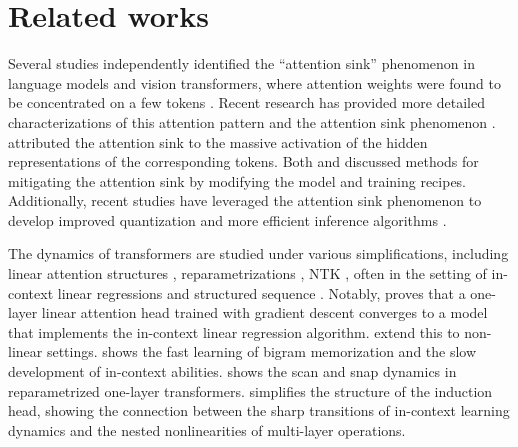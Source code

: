 \section{Related works}
Several studies independently identified the ``attention sink'' phenomenon in language models and vision transformers,  where attention weights were found to be concentrated on a few tokens \citep{xiao2023efficient, darcet2023vision, han2023lm, zhai2023stabilizing, elhage2023privileged, dettmers2022gpt3}. Recent research has provided more detailed characterizations of this attention pattern and the attention sink phenomenon \citep{fu2024attentionpattern, sun2024massive}. \citet{sun2024massive} attributed the attention sink to the massive activation of the hidden representations of the corresponding tokens. Both \citet{sun2024massive} and \citet{zhai2023stabilizing} discussed methods for mitigating the attention sink by modifying the model and training recipes. Additionally, recent studies have leveraged the attention sink phenomenon to develop improved quantization and more efficient inference algorithms \citep{liu2024intactkv, chen2024image, yu2024unveiling, son2024prefixing}.

The dynamics of transformers are studied under various simplifications, including linear attention structures \citep{zhang2023trained,ahn2024transformers}, reparametrizations \citep{tian2023joma}, NTK \citep{deora2023optimization}, often in the setting of in-context linear regressions \citep{ahn2023linear,wu2023many,zhang2024context} and structured sequence  \citep{bietti2024birth,nichani2024transformers,tian2023scan}. Notably, \citet{zhang2023trained} proves that a one-layer linear attention head trained with gradient descent converges to a model that implements the in-context linear regression algorithm.
\cite{huang2023context,kim2024transformers} extend this to non-linear settings. \cite{bietti2024birth} shows the fast learning of bigram memorization and the slow development of in-context abilities. \cite{tian2023scan} shows the scan and snap dynamics in reparametrized one-layer transformers. \cite{reddy2023mechanistic} simplifies the structure of the induction head, showing the connection between the sharp transitions of in-context learning dynamics and the nested nonlinearities of multi-layer operations.

